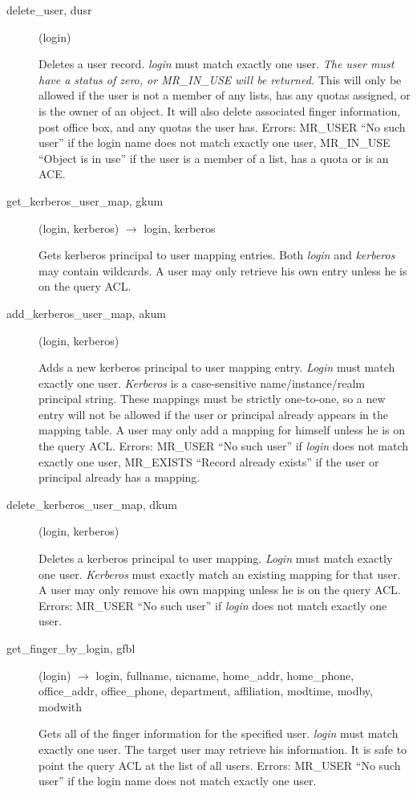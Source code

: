 \documentclass{article}
\begin{document}
\begin{description}
\item[delete\_user, dusr](login)

Deletes a user record. {\em login} must match exactly one user. {\em
The user must have a status of zero, or MR\_IN\_USE will be returned.}
This will only be allowed if the user is not a member of any lists,
has any quotas assigned, or is the owner of an object. It will also
delete associated finger information, post office box, and any quotas
the user has. Errors: MR\_USER ``No such user'' if the login name does
not match exactly one user, MR\_IN\_USE ``Object is in use'' if the user
is a member of a list, has a quota or is an ACE.

\item[get\_kerberos\_user\_map, gkum](login, kerberos) $\rightarrow$ login,
kerberos

Gets kerberos principal to user mapping entries.  Both {\em login} and
{\em kerberos} may contain wildcards.  A user may only retrieve his own
entry unless he is on the query ACL.

\item[add\_kerberos\_user\_map, akum](login, kerberos)

Adds a new kerberos principal to user mapping entry.  {\em Login} must
match exactly one user.  {\em Kerberos} is a case-sensitive
name/instance/realm principal string.  These mappings must be strictly
one-to-one, so a new entry will not be allowed if the user or
principal already appears in the mapping table.  A user may only add a
mapping for himself unless he is on the query ACL.  Errors: MR\_USER
``No such user'' if {\em login} does not match exactly one user,
MR\_EXISTS ``Record already exists'' if the user or principal already
has a mapping.

\item[delete\_kerberos\_user\_map, dkum](login, kerberos)

Deletes a kerberos principal to user mapping.  {\em Login} must match
exactly one user.  {\em Kerberos} must exactly match an existing mapping
for that user.  A user may only remove his own mapping unless he is on
the query ACL.  Errors: MR\_USER ``No such user'' if {\em login} does not
match exactly one user.

\item[get\_finger\_by\_login, gfbl](login) $\rightarrow$ login, fullname, nicname,
home\_addr, home\_phone, office\_addr, office\_phone, department,
affiliation, modtime, modby, modwith

Gets all of the finger information for the specified user.  {\em login}
must match exactly one user.  The target user may retrieve his
information.  It is safe to point the query ACL at the list of all
users.  Errors: MR\_USER ``No such user'' if the login name does not
match exactly one user.


\end{description}
\end{document}
